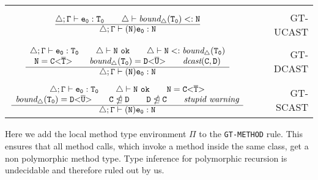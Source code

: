 {\begin{minipage}{\textwidth}
\begin{small}
\begin{tabularx}{\textwidth}{c X r}
& \\

$\frac{\displaystyle \mathtt{\triangle; \Gamma \vdash e_0 : T_0 \quad \quad \triangle \vdash \textit{bound}_\triangle(T_0) <: N}}{\displaystyle \mathtt{\triangle; \Gamma \vdash (N) e_0 : N}}
$ & & GT-UCAST \\

& \\

$ \frac{\displaystyle \begin{array}{c}
  \mathtt{\triangle; \Gamma \vdash e_0 : T_0 \quad \quad \triangle \vdash N\ \texttt{ok} \quad \quad \triangle \vdash N <: \textit{bound}_\triangle(T_0) } \\
  \mathtt{N = \mathtt{C {\tt <} \overline{\tt T} {\tt >} } \quad \quad \textit{bound}_\triangle(T_0) = \mathtt{D {\tt <} \overline{\tt U} {\tt >} }  \quad \quad \textit{dcast}(C,D)}
\end{array}
}{\displaystyle \mathtt{\triangle; \Gamma \vdash (N) e_0 : N}}$ & & GT-DCAST \\

& \\

$\frac{\displaystyle \begin{array}{c}
  \mathtt{\triangle; \Gamma \vdash e_0 : T_0 \quad \quad \triangle \vdash N\ \texttt{ok} \quad \quad N = \mathtt{C {\tt <} \overline{\tt T} {\tt >} }  } \\
  \mathtt{\textit{bound}_\triangle(T_0) = \mathtt{D {\tt <} \overline{\tt U} {\tt >} } \quad \quad C \ntrianglelefteq D \quad \quad D \ntrianglelefteq C \quad \quad \textit{stupid warning}}
\end{array}}{\displaystyle \mathtt{\triangle; \Gamma \vdash (N) e_0 : N}}
$ & & GT-SCAST 
\end{tabularx}
\end{small}
\end{minipage}
}


Here we add the local method type environment $\mathtt{\Pi}$ to the \texttt{GT-METHOD} rule.
This ensures that all method calls, which invoke a method inside the same class, get a non polymorphic method type.
Type inference for polymorphic recursion is undecidable and therefore ruled out by us.

